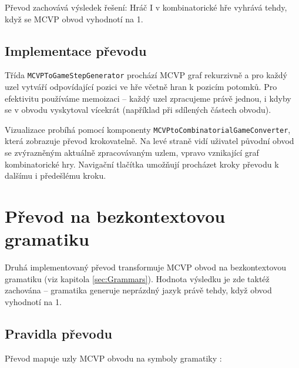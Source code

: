 Převod zachovává výsledek řešení: Hráč I v kombinatorické hře vyhrává tehdy, když se MCVP obvod vyhodnotí na 1.

\subsection{Implementace převodu}
\label{sec:MCVPtoGameImplementation}

Třída \texttt{MCVPToGameStepGenerator} prochází MCVP graf rekurzivně a pro každý uzel vytváří odpovídající pozici ve hře včetně hran k pozicím potomků. Pro efektivitu používáme memoizaci – každý uzel zpracujeme právě jednou, i kdyby se v obvodu vyskytoval vícekrát (například při sdílených částech obvodu).

Vizualizace probíhá pomocí komponenty \texttt{MCVPtoCombinatorialGameConverter}, která zobrazuje převod krokovatelně. Na levé straně vidí uživatel původní obvod se zvýrazněným aktuálně zpracovávaným uzlem, vpravo vznikající graf kombinatorické hry. Navigační tlačítka umožňují procházet kroky převodu k dalšímu i předešlému kroku.

\section{Převod na bezkontextovou gramatiku}
\label{sec:MCVPtoGrammar}

Druhá implementovaný převod transformuje MCVP obvod na bezkontextovou gramatiku (viz kapitola \ref{sec:Grammars}). Hodnota výsledku je zde taktéž zachována – gramatika generuje neprázdný jazyk právě tehdy, když obvod vyhodnotí na 1.

\subsection{Pravidla převodu}
\label{sec:MCVPtoGrammarPrinciple}

Převod mapuje uzly MCVP obvodu na symboly gramatiky \cite{sawa}:

